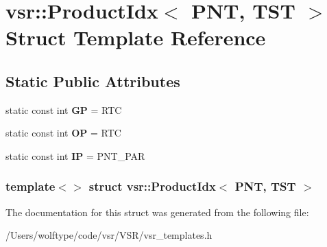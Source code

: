 \hypertarget{structvsr_1_1_product_idx_3_01_p_n_t_00_01_t_s_t_01_4}{\section{vsr\-:\-:Product\-Idx$<$ P\-N\-T, T\-S\-T $>$ Struct Template Reference}
\label{structvsr_1_1_product_idx_3_01_p_n_t_00_01_t_s_t_01_4}
}
\subsection*{Static Public Attributes}
\begin{DoxyCompactItemize}
\item 
\hypertarget{structvsr_1_1_product_idx_3_01_p_n_t_00_01_t_s_t_01_4_ae64c7e1d067e08f408ee5c70929d4f04}{static const int {\bfseries G\-P} = R\-T\-C}\label{structvsr_1_1_product_idx_3_01_p_n_t_00_01_t_s_t_01_4_ae64c7e1d067e08f408ee5c70929d4f04}

\item 
\hypertarget{structvsr_1_1_product_idx_3_01_p_n_t_00_01_t_s_t_01_4_a46420250d7be005e39a0313a62f568c7}{static const int {\bfseries O\-P} = R\-T\-C}\label{structvsr_1_1_product_idx_3_01_p_n_t_00_01_t_s_t_01_4_a46420250d7be005e39a0313a62f568c7}

\item 
\hypertarget{structvsr_1_1_product_idx_3_01_p_n_t_00_01_t_s_t_01_4_ae5783351e56689d64b3372341698d817}{static const int {\bfseries I\-P} = P\-N\-T\-\_\-\-P\-A\-R}\label{structvsr_1_1_product_idx_3_01_p_n_t_00_01_t_s_t_01_4_ae5783351e56689d64b3372341698d817}

\end{DoxyCompactItemize}
\subsubsection*{template$<$$>$ struct vsr\-::\-Product\-Idx$<$ P\-N\-T, T\-S\-T $>$}



The documentation for this struct was generated from the following file\-:\begin{DoxyCompactItemize}
\item 
/\-Users/wolftype/code/vsr/\-V\-S\-R/vsr\-\_\-templates.\-h\end{DoxyCompactItemize}
